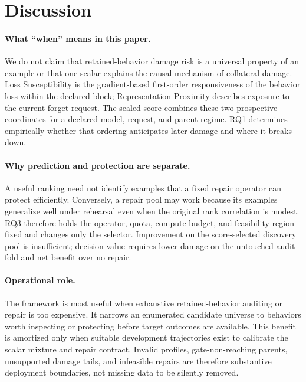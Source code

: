 \section{Discussion}
\label{sec:implications}

\paragraph{What ``when'' means in this paper.}
We do not claim that retained-behavior damage risk is a universal property
of an example or that one scalar explains the causal mechanism of collateral
damage. Loss Susceptibility is the gradient-based first-order responsiveness
of the behavior loss within the declared block; Representation Proximity
describes
exposure to the current forget request.
The sealed score combines these two prospective coordinates for a declared
model, request, and parent regime. RQ1 determines empirically whether that
ordering anticipates later damage and where it breaks down.

\paragraph{Why prediction and protection are separate.}
A useful ranking need not identify examples that a fixed repair operator can
protect efficiently. Conversely, a repair pool may work because its examples
generalize well under rehearsal even when the original rank correlation is
modest. RQ3 therefore holds the operator, quota, compute budget, and
feasibility region fixed and changes only the selector. Improvement on the
score-selected discovery pool is insufficient; decision value requires lower
damage on the untouched audit fold and net benefit over no repair.

\paragraph{Operational role.}
The framework is most useful when exhaustive retained-behavior auditing or
repair is too expensive. It narrows an enumerated candidate universe to
behaviors worth inspecting or protecting before target outcomes are available.
This benefit is amortized only when suitable development trajectories exist to
calibrate the scalar mixture and repair contract. Invalid profiles,
gate-non-reaching parents, unsupported damage tails, and infeasible repairs
are therefore substantive deployment boundaries, not missing data to be
silently removed.
